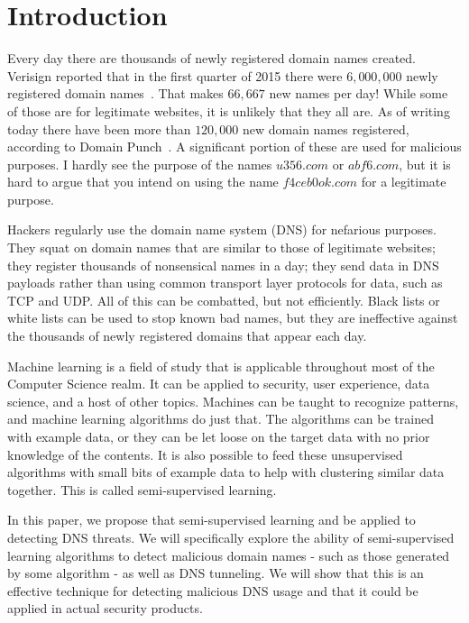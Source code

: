 \section{Introduction}

Every day there are thousands of newly registered domain names created.
Verisign reported that in the first quarter of 2015 there were $6,000,000$ newly registered domain names~\cite{verisign}.
That makes $66,667$ new names per day!
While some of those are for legitimate websites, it is unlikely that they all are.
As of writing today there have been more than $120,000$ new domain names registered, according to Domain Punch~\cite{domainpunch}.
A significant portion of these are used for malicious purposes.
I hardly see the purpose of the names $u356.com$ or $abf6.com$, but it is hard to argue that you
intend on using the name $f4ceb0ok.com$ for a legitimate purpose.

Hackers regularly use the domain name system (DNS) for nefarious purposes.
They squat on domain names that are similar to those of legitimate websites; they register thousands
of nonsensical names in a day; they send data in DNS payloads rather than using common transport
layer protocols for data, such as TCP and UDP.
All of this can be combatted, but not efficiently.
Black lists or white lists can be used to stop known bad names, but they are ineffective against
the thousands of newly registered domains that appear each day.

Machine learning is a field of study that is applicable throughout most of the Computer Science realm.
It can be applied to security, user experience, data science, and a host of other topics.
Machines can be taught to recognize patterns, and machine learning algorithms do just that.
The algorithms can be trained with example data, or they can be let loose on the target data with
no prior knowledge of the contents.
It is also possible to feed these unsupervised algorithms with small bits of example data to help
with clustering similar data together.
This is called semi-supervised learning.

In this paper, we propose that semi-supervised learning and be applied to detecting DNS threats.
We will specifically explore the ability of semi-supervised learning algorithms to detect malicious
domain names - such as those generated by some algorithm - as well as DNS tunneling.
We will show that this is an effective technique for detecting malicious DNS usage and that it could
be applied in actual security products.
